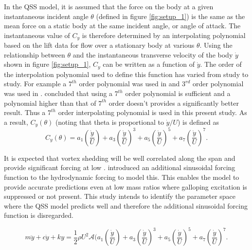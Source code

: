 In the QSS model, it is assumed that the force on the body at a given instantaneous incident angle $\theta$ (defined in figure \ref{fig:setup_1}) is the same as the mean force on a static body at the same incident angle, or angle of attack. The instantaneous value of $C_y$ is therefore determined by an interpolating polynomial based on the lift data for flow over a stationary body at various $\theta$. Using the relationship between $\theta$ and the instantaneous transverse velocity of the body $\dot{y}$ shown in figure \ref{fig:setup_1}, $C_y$ can be written as a function of $\dot{y}$. The order of the interpolation polynomial used to define this function has varied from study to study. For  example a $7^{th}$ order polynomial was used in \cite{Parkinson1964} and $3^{rd}$ order polynomial was used in \cite{Barrero-Gil2009}. \cite{Ng2005} concluded that using a $7^{th}$ order polynomial is sufficient and a polynomial higher than that of $7^{th}$ order doesn't provides a significantly better result. Thus a $7 ^{th}$ order interpolating polynomial is used in this present study. As a result, $C_y(\theta)$ (noting that theta is proportional to $\dot{y}/U$) is defined as
\begin{equation}
\label{cy ploynomial}
C_y(\theta)=a_1\left(\frac{\dot{y}}{U}\right)+a_3\left(\frac{\dot{y}}{U}\right)^3+a_5\left(\frac{\dot{y}}{U}\right)^5+a_7\left(\frac{\dot{y}}{U}\right)^7.
\end{equation}


 It is expected that vortex shedding will be well correlated along the span and provide significant forcing at low \reynoldsnumber. \citet{Joly2012} introduced  an additional sinusoidal forcing function to the hydrodynamic forcing to model this. This enables the model to provide accurate predictions even at low mass ratios where galloping excitation is suppressed or not present. This study intends to identify the parameter space where the QSS model predicts well and therefore the additional sinusoidal forcing function is disregarded.  
 
 
 
\begin{equation}
\label{final_equation_motion}
m\ddot{y}{+}c\dot{y}{+}ky{=}\frac{1}{2}\rho U^2 \mathcal {A} \Bigg(a_1\left(\frac{\dot{y}}{U}\right){+}a_3\left(\frac{\dot{y}}{U}\right)^3{+}a_5\left(\frac{\dot{y}}{U}\right)^5{+}a_7\left(\frac{\dot{y}}{U}\right)^7.
\end{equation}


